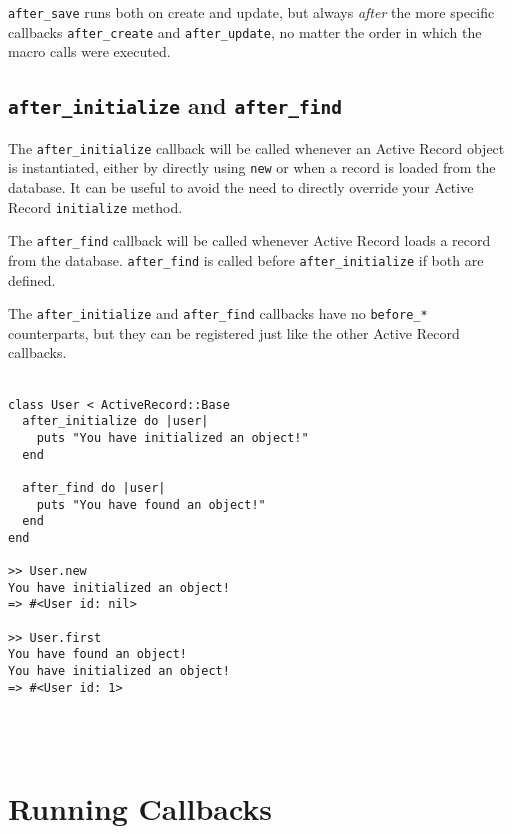 \documentclass[10pt]{book}
\begin{document}
\texttt{after\_save} runs both on create and update, but always \emph{after} the more specific callbacks \texttt{after\_create} and \texttt{after\_update}, no matter the order in which the macro calls were executed.

\subsection{ \texttt{after\_initialize} and \texttt{after\_find}}

The \texttt{after\_initialize} callback will be called whenever an Active Record object is instantiated, either by directly using \texttt{new} or when a record is loaded from the database. It can be useful to avoid the need to directly override your Active Record \texttt{initialize} method.

The \texttt{after\_find} callback will be called whenever Active Record loads a record from the database. \texttt{after\_find} is called before \texttt{after\_initialize} if both are defined.

The \texttt{after\_initialize} and \texttt{after\_find} callbacks have no \texttt{before\_*} counterparts, but they can be registered just like the other Active Record callbacks.
\\ \\
\begin{minipage}{\textwidth}{\scriptsize
\begin{verbatim}
class User < ActiveRecord::Base
  after_initialize do |user|
    puts "You have initialized an object!"
  end
 
  after_find do |user|
    puts "You have found an object!"
  end
end
 
>> User.new
You have initialized an object!
=> #<User id: nil>
 
>> User.first
You have found an object!
You have initialized an object!
=> #<User id: 1>
\end{verbatim}}
\end{minipage}
\\ \\

\section{ Running Callbacks}
\end{document}
